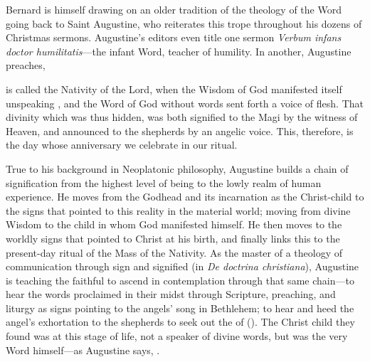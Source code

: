 Bernard is himself drawing on an older tradition of the theology of the Word
going back to Saint Augustine, who reiterates this trope throughout his dozens
of Christmas sermons.
Augustine's editors even title one sermon \emph{Verbum infans doctor
humilitatis}---the infant Word, teacher of humility.%
    \Autocite[1004, heading for sermon 187]{Augustine:SermonesPL}
In another, Augustine preaches,
\begin{quoting}
     is called the Nativity of the Lord, when the Wisdom of God
    manifested itself unspeaking , and the Word of God
    without words sent forth a voice of flesh.
    That divinity which was thus hidden, was both signified to the Magi by the
    witness of Heaven, and announced to the shepherds by an angelic voice.
    This, therefore, is the day whose anniversary we celebrate in our ritual.%
        \Autocite
        [997, Sermo 185, In Natali Domini 2: .]
        {Augustine:SermonesPL}
\end{quoting}
True to his background in Neoplatonic philosophy, Augustine builds a chain of
signification from the highest level of being to the lowly realm of human
experience.
He moves from the Godhead and its incarnation as the Christ-child to the signs
that pointed to this reality in the material world; moving from divine Wisdom to
the child in whom God manifested himself.
He then moves to the worldly signs that pointed to Christ at his birth, and
finally links this to the present-day ritual of the Mass of the Nativity.
As the master of a theology of communication through sign and signified (in
\emph{De doctrina christiana}), Augustine is teaching the faithful to ascend in
contemplation through that same chain---to hear the words proclaimed in their
midst through Scripture, preaching, and liturgy as signs pointing to the angels'
song in Bethlehem; to hear and heed the angel's exhortation to the shepherds to
seek out the  of  ().
The Christ child they found was at this  stage of life, not a
speaker of divine words, but was the very Word himself---as Augustine says,
.


